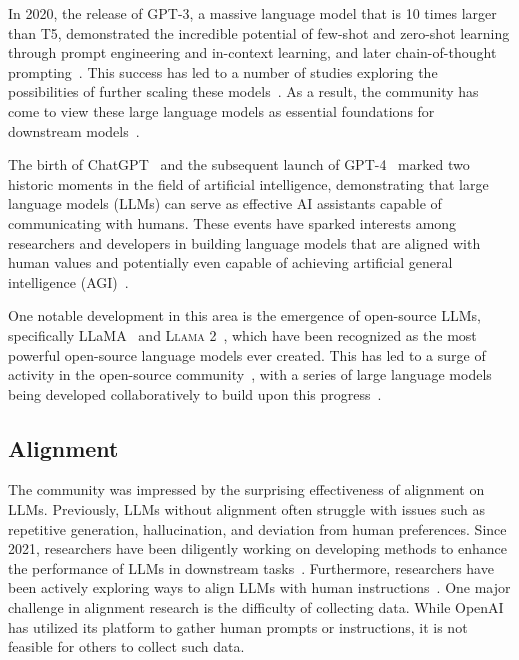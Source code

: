 In 2020, the release of GPT-3, a massive language model that is \num{10} times larger than T5, demonstrated the incredible potential of few-shot and zero-shot learning through prompt engineering and in-context learning, and later chain-of-thought prompting~\citep{cot}. This success has led to a number of studies exploring the possibilities of further scaling these models~\citep{bloom, opt,  glm, glm-130b, gshard, switch_transformer, glam, gpt-neo, gopher, chinchilla, palm, LaMDA}. As a result, the community has come to view these large language models as essential foundations for downstream models~\citep{foundation_models}. 

The birth of ChatGPT~\citep{chatgpt} and the subsequent launch of GPT-4~\citep{gpt4} marked two historic moments in the field of artificial intelligence, demonstrating that large language models (LLMs) can serve as effective AI assistants capable of communicating with humans. These events have sparked interests among researchers and developers in building language models that are aligned with human values and potentially even capable of achieving artificial general intelligence (AGI)~\citep{palm2, claude, claude2}.

One notable development in this area is the emergence of open-source LLMs, specifically LLaMA~\citep{llama} and \textsc{Llama 2}~\citep{llama2}, which have been recognized as the most powerful open-source language models ever created. This has led to a surge of activity in the open-source community~\citep{huggingface}, with a series of large language models being developed collaboratively to build upon this progress~\citep{mpt, falcon, chatglm2, baichuan2, internlm}. 

\subsection{Alignment}

The community was impressed by the surprising effectiveness of alignment on LLMs. Previously, LLMs without alignment often struggle with issues such as repetitive generation, hallucination, and deviation from human preferences. Since 2021, researchers have been diligently working on developing methods to enhance the performance of LLMs in downstream tasks~\citep{flan, t0, flan-collection, flanv2, bloomz}. Furthermore, researchers have been actively exploring ways to align LLMs with human instructions~\citep{instructgpt, askell2021general, PMP, cai}. One major challenge in alignment research is the difficulty of collecting data. While OpenAI has utilized its platform to gather human prompts or instructions, it is not feasible for others to collect such data. 

